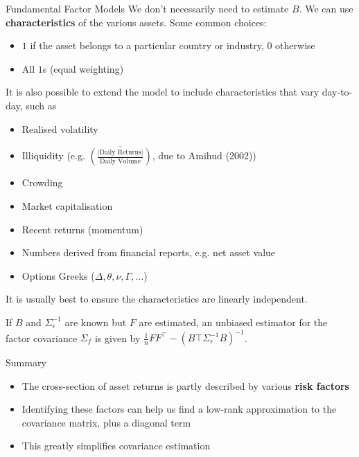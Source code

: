 \documentclass{beamer}
\begin{document}
\begin{frame}{Fundamental Factor Models}
	We don't necessarily need to estimate $B$. We can use \textbf{characteristics} of the various assets. Some common choices:
	\begin{itemize}
		\item $1$ if the asset belongs to a particular country or industry, $0$ otherwise
		\item All $1$s (equal weighting)
	\end{itemize}

	It is also possible to extend the model to include characteristics that vary day-to-day, such as
	\begin{itemize}
		\item Realised volatility
		\item Illiquidity (e.g. $\overline{\left(\frac{\vert \textrm{Daily Returns}\vert}{\textrm{Daily Volume}}\right)}$, due to Amihud (2002))

		\item Crowding
		\item Market capitalisation
		\item Recent returns (momentum)%
		\item Numbers derived from financial reports, e.g. net asset value
		\item Options Greeks ($\Delta,\theta,\nu,\Gamma,\ldots$)
	\end{itemize}

	It is usually best to ensure the characteristics are linearly independent.

	If $B$ and $\Sigma_\epsilon^{-1}$ are known but $F$ are estimated, an unbiased estimator for the factor covariance $\Sigma_f$ is given by $\frac{1}{n}F F^\top - (B\top \Sigma_\epsilon^{-1} B)^{-1}$.%
\end{frame}

\begin{frame}{Summary}
	\begin{itemize}
		\item The cross-section of asset returns is partly described by various \textbf{risk factors}
		\item Identifying these factors can help us find a low-rank approximation to the covariance matrix, plus a diagonal term
		\item This greatly simplifies covariance estimation
	\end{itemize}
\end{frame}
\end{document}
